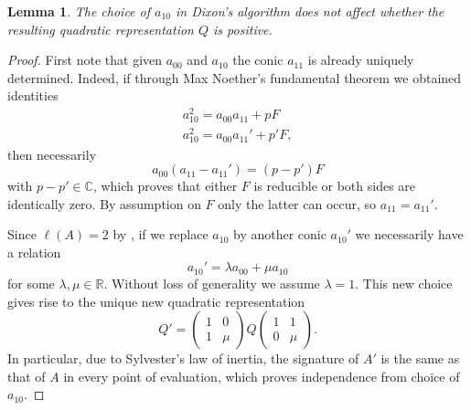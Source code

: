 \documentclass[10pt,a4paper]{amsart}
\newtheorem{lem}{Lemma}
\newcommand{\C}{{\mathbb C}}
\newcommand{\R}{{\mathbb R}}
\begin{document}
\begin{lem} \label{lem:indep}
    The choice of $a_{10}$ in Dixon's algorithm does not affect whether the resulting quadratic representation $Q$ is positive.
\end{lem}

\begin{proof}
    First note that given $a_{00}$ and $a_{10}$ the conic $a_{11}$ is already uniquely determined. Indeed, if through Max Noether's fundamental theorem we obtained identities
    \begin{align*}
        a_{10}^2 = a_{00}a_{11} + pF \\
        a_{10}^2 = a_{00}a_{11}' + p'F,
    \end{align*}
    then necessarily
    \begin{equation*}
        a_{00}(a_{11} - a_{11}') = (p-p')F
    \end{equation*}
    with $p - p' \in \C$, which proves that either $F$ is reducible or both sides are identically zero. By assumption on $F$ only the latter can occur, so $a_{11} = a_{11}'$.

    Since $\ell(A) = 2$ by , if we replace $a_{10}$ by another conic $a_{10}'$ we necessarily have a relation
    \begin{equation*}
        {a_{10}'} = \lambda a_{00} + \mu a_{10}
    \end{equation*}
    for some $\lambda, \mu \in \R$. Without loss of generality we assume $\lambda = 1$. This new choice gives rise to the unique new quadratic representation
    \begin{equation*}
        Q' = \begin{pmatrix}
            1 & 0 \\
            1 & \mu
        \end{pmatrix} Q \begin{pmatrix}
            1 & 1 \\
            0 & \mu
        \end{pmatrix}.
    \end{equation*}
    In particular, due to Sylvester's law of inertia, the signature of $A'$ is the same as that of $A$ in every point of evaluation, which proves independence from choice of $a_{10}$.
\end{proof}
\end{document}
